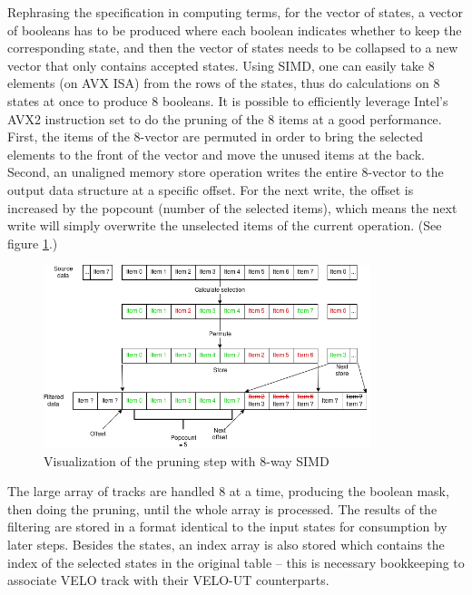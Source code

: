 \documentclass[12pt]{article}
\begin{document}
Rephrasing the specification in computing terms, for the vector of states, a vector of booleans has to be produced where each boolean indicates whether to keep the corresponding state, and then the vector of states needs to be collapsed to a new vector that only contains accepted states. Using SIMD, one can easily take 8 elements (on AVX ISA) from the rows of the states, thus do calculations on 8 states at once to produce 8 booleans. It is possible to efficiently leverage Intel's AVX2 instruction set to do the pruning of the 8 items at a good performance\cite{lemire_simd_prune}. First, the items of the 8-vector are permuted in order to bring the selected elements to the front of the vector and move the unused items at the back. Second, an unaligned memory store operation writes the entire 8-vector to the output data structure at a specific offset. For the next write, the offset is increased by the popcount (number of the selected items), which means the next write will simply overwrite the unselected items of the current operation. (See figure \ref{fig_velout_opt_simd_filter}.)

\begin{figure}[H]
	\begin{center}
		\includegraphics[width=0.85\textwidth]{velout_opt_simd_filter}
	\end{center}
	\caption{Visualization of the pruning step with 8-way SIMD}
	\label{fig_velout_opt_simd_filter}
\end{figure}

The large array of tracks are handled 8 at a time, producing the boolean mask, then doing the pruning, until the whole array is processed. The results of the filtering are stored in a format identical to the input states for consumption by later steps. Besides the states, an index array is also stored which contains the index of the selected states in the original table -- this is necessary bookkeeping to associate VELO track with their VELO-UT counterparts.
\end{document}
